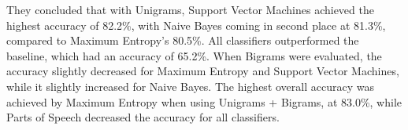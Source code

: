 They concluded that with Unigrams, Support Vector Machines achieved the highest accuracy of 82.2\%, with Naive Bayes coming in second place at 81.3\%, compared to Maximum Entropy's 80.5\%. All classifiers outperformed the baseline, which had an accuracy of 65.2\%. When Bigrams were evaluated, the accuracy slightly decreased for Maximum Entropy and Support Vector Machines, while it slightly increased for Naive Bayes. The highest overall accuracy was achieved by Maximum Entropy when using Unigrams + Bigrams, at 83.0\%, while Parts of Speech decreased the accuracy for all classifiers.







